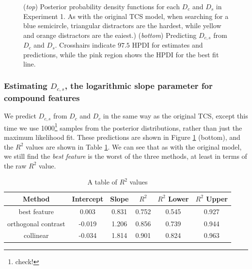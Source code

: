 \documentclass[smallextended, natbib]{svjour3}       %
\begin{document}
\begin{figure}
\centering
{}
\caption{(\textit{top}) Posterior probability density functions for each $D_c$ and $D_s$ in Experiment 1. As with the original TCS model, when searching for a blue semicircle, triangular distractors are the hardest, while yellow and orange distractors are the eaiest.) (\textit{bottom}) Predicting $D_{c,s}$ from $D_c$ and $D_s$. Crosshairs indicate $97.5$ HPDI for estimates and predictions, while the pink region shows the HPDI for the best fit line. }
\label{fig:buetti2019_D}
\end{figure}

\subsubsection{Estimating $D_{c,s}$, the logarithmic slope parameter for compound features}

We predict $D_{c,s}$ from $D_c$ and $D_c$ in the same way as the original TCS, except this time we use 1000\footnote{check!} samples from the posterior distributions, rather than just the maximum likelihood fit. These predictions are shown in Figure \ref{fig:buetti2019_D} (bottom), and the $R^2$ values are shown in Table \ref{tab:reimp_D_r2}. We can see that as with the original model, we still find the \textit{best feature} is the worst of the three methods, at least in terms of the raw $R^2$ value.

\begin{table}[h]
\centering
\begin{tabular}{ c|c|c|c|c|c } 
Method & Intercept & Slope & $R^2$ & $R^2$ Lower & $R^2$ Upper \\
 \hline 
best feature & 0.003 & 0.831 & 0.752 & 0.545 & 0.927\\ 
 orthogonal contrast & -0.019 & 1.206 & 0.856 & 0.739 & 0.944\\ 
 collinear & -0.034 & 1.814	& 0.901 & 0.824 & 0.963\\
\end{tabular}
\caption{A table of $R^2$ values}
\label{tab:reimp_D_r2}
\end{table}
\end{document}
